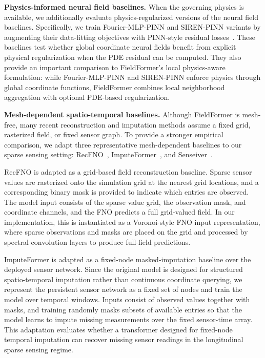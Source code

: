 \noindent\textbf{Physics-informed neural field baselines.}
When the governing physics is available, we additionally evaluate physics-regularized versions of the neural field baselines. Specifically, we train Fourier-MLP-PINN and SIREN-PINN variants by augmenting their data-fitting objectives with PINN-style residual losses~\citep{raissi2019physics}. These baselines test whether global coordinate neural fields benefit from explicit physical regularization when the PDE residual can be computed. They also provide an important comparison to FieldFormer's local physics-aware formulation: while Fourier-MLP-PINN and SIREN-PINN enforce physics through global coordinate functions, FieldFormer combines local neighborhood aggregation with optional PDE-based regularization.

\noindent\textbf{Mesh-dependent spatio-temporal baselines.}
Although FieldFormer is mesh-free, many recent reconstruction and imputation methods assume a fixed grid, rasterized field, or fixed sensor graph. To provide a stronger empirical comparison, we adapt three representative mesh-dependent baselines to our sparse sensing setting: RecFNO~\citep{zhao2024recfno}, ImputeFormer~\citep{nie2024imputeformer}, and Senseiver~\citep{santos2023development}.

RecFNO is adapted as a grid-based field reconstruction baseline. Sparse sensor values are rasterized onto the simulation grid at the nearest grid locations, and a corresponding binary mask is provided to indicate which entries are observed. The model input consists of the sparse value grid, the observation mask, and coordinate channels, and the FNO predicts a full grid-valued field. In our implementation, this is instantiated as a Voronoi-style FNO input representation, where sparse observations and masks are placed on the grid and processed by spectral convolution layers to produce full-field predictions.

ImputeFormer is adapted as a fixed-node masked-imputation baseline over the deployed sensor network. Since the original model is designed for structured spatio-temporal imputation rather than continuous coordinate querying, we represent the persistent sensor network as a fixed set of nodes and train the model over temporal windows. Inputs consist of observed values together with masks, and training randomly masks subsets of available entries so that the model learns to impute missing measurements over the fixed sensor-time array. This adaptation evaluates whether a transformer designed for fixed-node temporal imputation can recover missing sensor readings in the longitudinal sparse sensing regime.

